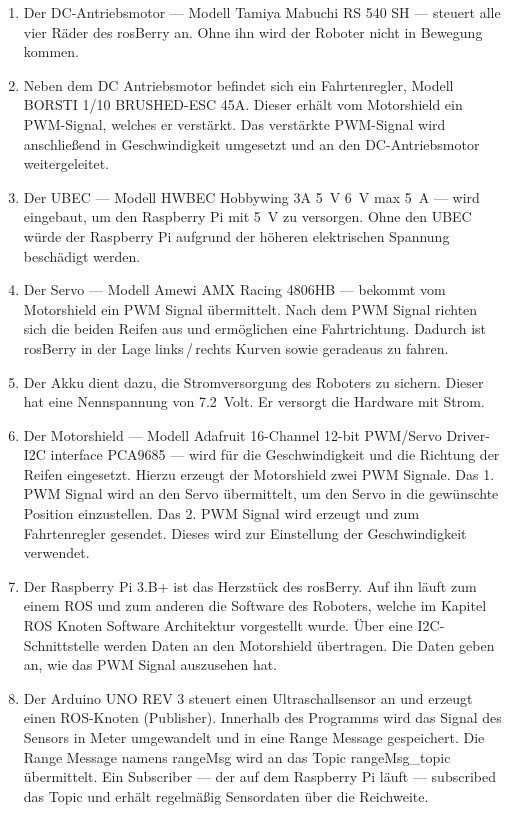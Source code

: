 \documentclass[conference]{IEEEtran}
\begin{document}
	\begin{enumerate}
		\item Der DC-Antriebsmotor — Modell Tamiya Mabuchi RS 540 SH — steuert alle vier Räder des rosBerry an.
		Ohne ihn wird der Roboter nicht in Bewegung kommen.
		\item Neben dem DC Antriebsmotor befindet sich ein Fahrtenregler, Modell BORSTI 1/10 BRUSHED-ESC 45A.
		Dieser erhält vom Motorshield ein PWM-Signal, welches er verstärkt.
		Das verstärkte PWM-Signal wird anschließend in Geschwindigkeit umgesetzt und an den DC-Antriebsmotor weitergeleitet.
		\item Der UBEC — Modell HWBEC Hobbywing 3A \SI{5}{V} \SI{6}{V} max \SI{5}{A} — wird eingebaut, um den Raspberry Pi mit \SI{5}{V} zu versorgen.
		Ohne den UBEC würde der Raspberry Pi aufgrund der höheren elektrischen Spannung beschädigt werden.
		\item Der Servo — Modell Amewi AMX Racing 4806HB — bekommt vom Motorshield ein PWM Signal übermittelt.
		Nach dem PWM Signal richten sich die beiden Reifen aus und ermöglichen eine Fahrtrichtung.
		Dadurch ist rosBerry in der Lage links\,/\,rechts Kurven sowie geradeaus zu fahren.
		\item Der Akku dient dazu, die Stromversorgung des Roboters zu sichern.
		Dieser hat eine Nennspannung von \SI{7,2}{Volt}. Er versorgt die Hardware mit Strom.
		\item Der Motorshield — Modell Adafruit 16-Channel 12-bit PWM/Servo Driver-I2C interface PCA9685 — wird für die Geschwindigkeit und die Richtung der Reifen eingesetzt.
		Hierzu erzeugt der Motorshield zwei PWM Signale.
		Das 1. PWM Signal wird an den Servo übermittelt, um den Servo in die gewünschte Position einzustellen.
		Das 2. PWM Signal wird erzeugt und zum Fahrtenregler gesendet.
		Dieses wird zur Einstellung der Geschwindigkeit verwendet.
		\item Der Raspberry Pi 3.B+ ist das Herzstück des rosBerry.
		Auf ihn läuft zum einem ROS und zum anderen die Software des Roboters, welche im Kapitel ROS Knoten Software Architektur vorgestellt wurde.
		Über eine I2C-Schnittstelle werden Daten an den Motorshield übertragen.
		Die Daten geben an, wie das PWM Signal auszusehen hat.
		\item Der Arduino UNO REV 3 steuert einen Ultraschallsensor an und erzeugt einen ROS-Knoten (Publisher).
		Innerhalb des Programms wird das Signal des Sensors in Meter umgewandelt und in eine Range Message gespeichert.
		Die Range Message namens rangeMsg wird an das Topic rangeMsg\_topic übermittelt.
		Ein Subscriber — der auf dem Raspberry Pi läuft — subscribed das Topic und erhält regelmäßig Sensordaten über die Reichweite.
		

\end{enumerate}
\end{document}
